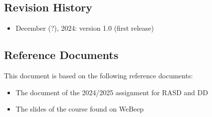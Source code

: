 
\subsection{Revision History}
    \begin{itemize}
        \item {December (?), 2024: version 1.0 (first release)}
    \end{itemize}

\subsection{Reference Documents}
    This document is based on the following reference documents:
    \begin{itemize}
        \item {The document of the 2024/2025 assignment for RASD and DD }
        \item {The slides of the course found on WeBeep}
    \end{itemize}


